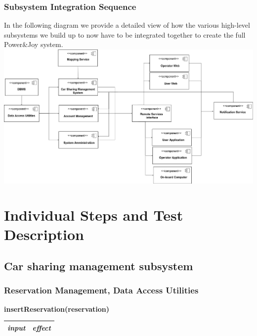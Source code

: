 \documentclass{article}
\begin{document}
\begin{flushleft}
  \newpage
   \subsubsection{Subsystem  Integration  Sequence}		%
   In the following diagram we provide a  detailed view of how the various high-level subsystems we build up to now have to be integrated together to create the full Power\&Joy system.\\
    \vspace{1cm}
     \includegraphics[scale=0.25]{Diagramma8}
     
     \newpage
  
  
  \section{Individual Steps and Test Description} 		%
  
  \subsection{Car sharing management subsystem} %
  \subsubsection{Reservation Management, Data Access Utilities} %

     \begin{center} 
    \begin {flushleft}
    \textbf{insertReservation(reservation)}
    \end{flushleft}
        \begin{tabular}{  |  p{6cm} | p{6cm} |}
    \hline
    \textit{input} &  \textit{effect} \\
    \hline
    

\end{tabular}
\end{center}
\end{flushleft}
\end{document}

